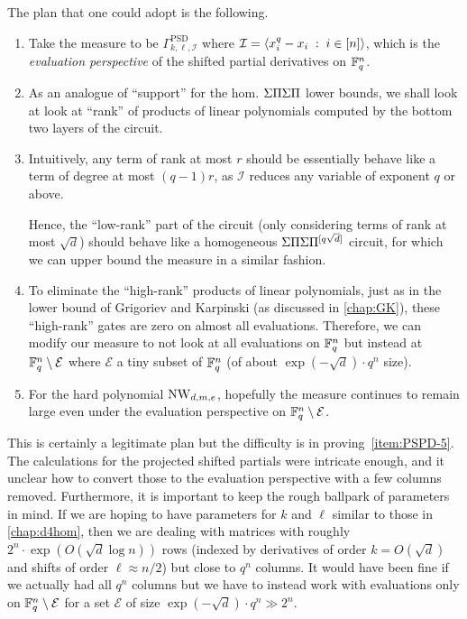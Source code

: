 \noindent 
The plan that one could adopt is the following. 
\begin{enumerate}
\itemsep 0pt
\item\label{item:PSPD-1} Take the measure to be $\Gamma^{\mathrm{PSD}}_{k,\ell,\mathcal{I}}$ where $\mathcal{I} = \left\langle x_i^q - x_i \;:\; i\in [n]\right\rangle$, which is the \emph{evaluation perspective} of the shifted partial derivatives on $\mathbb{F}_q^n$.
\item\label{item:PSPD-2} As an analogue of ``support'' for the hom. $\Sigma\Pi\Sigma\Pi$ lower bounds, we shall look at look at ``rank'' of products of linear polynomials computed by the bottom two layers of the circuit. 
\item\label{item:PSPD-3} Intuitively, any term of rank at most $r$ should be essentially behave like a term of degree at most $(q-1)r$, as $\mathcal{I}$ reduces any variable of exponent $q$ or above. 

Hence, the ``low-rank'' part of the circuit (only considering terms of rank at most $\sqrt{d}$) should behave like a homogeneous $\Sigma\Pi\Sigma\Pi^{[q\sqrt{d}]}$ circuit, for which we can upper bound the measure in a similar fashion. 
\item\label{item:PSPD-4} To eliminate the ``high-rank'' products of linear polynomials, just as in the lower bound of Grigoriev and Karpinski \cite{grigoriev98} (as discussed in \autoref{chap:GK}), these ``high-rank'' gates are zero on almost all evaluations. 
Therefore, we can modify our measure to not look at all evaluations on $\mathbb{F}_q^n$ but instead at $\mathbb{F}_q^n \setminus \mathcal{E}$ where $\mathcal{E}$ a tiny subset of $\mathbb{F}_q^n$ (of about $\exp(-\sqrt{d}) \cdot q^n$ size). 

\item\label{item:PSPD-5} For the hard polynomial $\operatorname{\mathrm{NW}}_{d,m,e}$, hopefully the measure continues to remain large even under the evaluation perspective on $\mathbb{F}_q^n \setminus \mathcal{E}$. 
\end{enumerate}

This is certainly a legitimate plan but the difficulty is in proving~\autoref{item:PSPD-5}.
The calculations for the projected shifted partials were intricate enough, and it unclear how to convert those to the evaluation perspective with a few columns removed.
Furthermore, it is important to keep the rough ballpark of parameters in mind.
If we are hoping to have parameters for $k$ and $\ell$ similar to those in \autoref{chap:d4hom}, then we are dealing with matrices with roughly $2^n \cdot \exp(O(\sqrt{d}\log n))$ rows (indexed by derivatives of order $k = O(\sqrt{d})$ and shifts of order $\ell \approx n/2$) but close to $q^n$ columns.
It would have been fine if we actually had all $q^n$ columns but we have to instead work with evaluations only on $\mathbb{F}_q^n \setminus \mathcal{E}$ for a set $\mathcal{E}$ of size $\exp{(-\sqrt{d})} \cdot q^n \gg 2^n$. 

